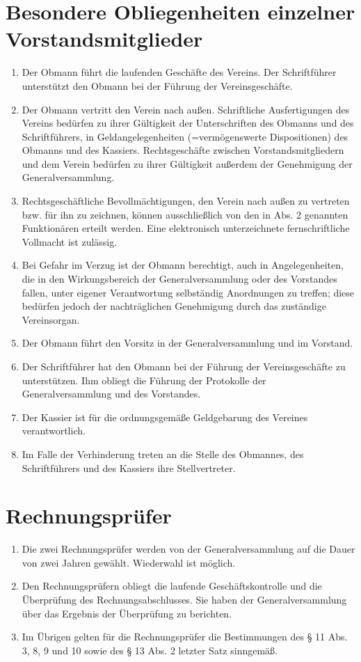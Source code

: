 \documentclass[a4paper,12pt]{article}
\begin{document}
\section{Besondere Obliegenheiten einzelner Vorstandsmitglieder} %
\begin{enumerate}
\item Der Obmann führt die laufenden Geschäfte des Vereins. Der Schriftführer unterstützt den Obmann bei der Führung der Vereinsgeschäfte.
\item Der Obmann vertritt den Verein nach außen. Schriftliche Ausfertigungen des Vereins bedürfen zu ihrer Gültigkeit der Unterschriften des Obmanns und des Schriftführers, in Geldangelegenheiten (=vermögenswerte Dispositionen) des Obmanns und des Kassiers. Rechtsgeschäfte zwischen Vorstandsmitgliedern und dem Verein bedürfen zu ihrer Gültigkeit außerdem der Genehmigung der Generalversammlung.
\item Rechtsgeschäftliche Bevollmächtigungen, den Verein nach außen zu vertreten bzw. für ihn zu zeichnen, können ausschließlich von den in Abs. 2 genannten Funktionären erteilt werden. Eine elektronisch unterzeichnete fernschriftliche Vollmacht ist zulässig.
\item Bei Gefahr im Verzug ist der Obmann berechtigt, auch in Angelegenheiten, die in den Wirkungsbereich der Generalversammlung oder des Vorstandes fallen, unter eigener Verantwortung selbständig Anordnungen zu treffen; diese bedürfen jedoch der nachträglichen Genehmigung durch das zuständige Vereinsorgan.
\item Der Obmann führt den Vorsitz in der Generalversammlung und im Vorstand.
\item Der Schriftführer hat den Obmann bei der Führung der Vereinsgeschäfte zu unterstützen. Ihm obliegt die Führung der Protokolle der Generalversammlung und des Vorstandes.
\item Der Kassier ist für die ordnungsgemäße Geldgebarung des Vereines verantwortlich.
\item Im Falle der Verhinderung treten an die Stelle des Obmannes, des Schriftführers und des Kassiers ihre Stellvertreter.
\end{enumerate}

\section{Rechnungsprüfer} %
\begin{enumerate}
\item Die zwei Rechnungsprüfer werden von der Generalversammlung auf die Dauer von zwei Jahren gewählt. Wiederwahl ist möglich.
\item Den Rechnungsprüfern obliegt die laufende Geschäftskontrolle und die Überprüfung des Rechnungsabschlusses. Sie haben der Generalversammlung über das Ergebnis der Überprüfung zu berichten.
\item Im Übrigen gelten für die Rechnungsprüfer die Bestimmungen des § 11 Abs. 3, 8, 9 und 10 sowie des § 13 Abs. 2 letzter Satz sinngemäß.
\end{enumerate}
\end{document}
